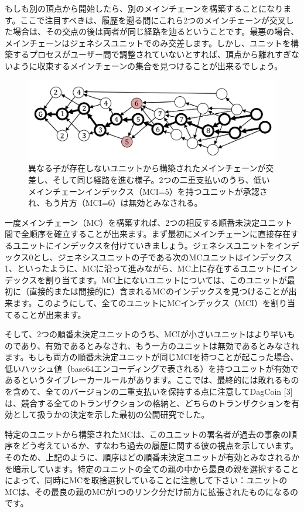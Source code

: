 \documentclass[a4paper, dvipdfmx]{jsarticle}
\begin{document}
もしも別の頂点から開始したら、別のメインチェーンを構築することになります。ここで注目すべきは、履歴を遡る間にこれら2つのメインチェーンが交叉した場合は、その交点の後は両者が同じ経路を辿るということです。最悪の場合、メインチェーンはジェネシスユニットでのみ交差します。しかし、ユニットを構築するプロセスがユーザー間で調整されていないとすれば、頂点から離れすぎないように収束するメインチェーンの集合を見つけることが出来るでしょう。

\begin{figure}[htbp]
  \includegraphics[width=\linewidth]{fig3.png}
  \caption{異なる子が存在しないユニットから構築されたメインチェーンが交差し、そして同じ経路を進む様子。2つの二重支払いのうち、低いメインチェーンインデックス（MCI=5）を持つユニットが承認され、もう片方（MCI=6）は無効とみなされる。}
\end{figure}

一度メインチェーン（MC）を構築すれば、2つの相反する順番未決定ユニット間で全順序を確立することが出来ます。まず最初にメインチェーンに直接存在するユニットにインデックスを付けていきましょう。ジェネシスユニットをインデックス0とし、ジェネシスユニットの子である次のMCユニットはインデックス1、といったように、MCに沿って進みながら、MC上に存在するユニットにインデックスを割り当てます。MC上にないユニットについては、このユニットが最初に（直接的または間接的に）含まれるMCのインデックスを見つけることが出来ます。このようにして、全てのユニットにMCインデックス（MCI）を割り当てることが出来ます。

そして、2つの順番未決定ユニットのうち、MCIが小さいユニットはより早いものであり、有効であるとみなされ、もう一方のユニットは無効であるとみなされます。もしも両方の順番未決定ユニットが同じMCIを持つことが起こった場合、低いハッシュ値（base64エンコーディングで表される）を持つユニットが有効であるというタイブレーカールールがあります。ここでは、最終的には敗れるものを含めて、全てのバージョンの二重支払いを保持する点に注意してDagCoin [3]は、競合する全てのトランザクションの格納と、どちらのトランザクションを有効として扱うかの決定を示した最初の公開研究でした。

特定のユニットから構築されたMCは、このユニットの署名者が過去の事象の順序をどう考えているか、すなわち過去の履歴に関する彼の視点を示しています。そのため、上記のように、順序はどの順番未決定ユニットが有効とみなされるかを暗示しています。特定のユニットの全ての親の中から最良の親を選択することによって、同時にMCを取捨選択していることに注意して下さい：ユニットのMCは、その最良の親のMCが1つのリンク分だけ前方に拡張されたものになるのです。
\end{document}
